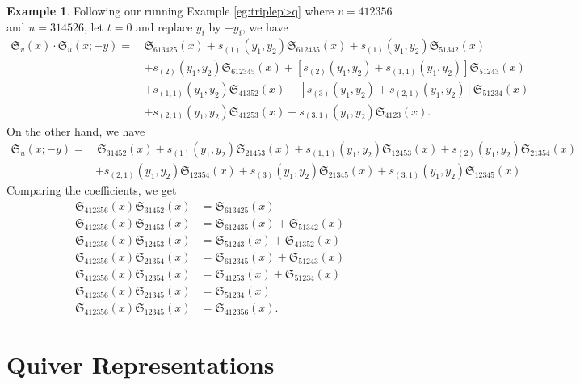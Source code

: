 \documentclass[12pt,reqno]{amsart}
\numberwithin{equation}{section}
\theoremstyle{definition}
\newtheorem{example}[theorem]{Example}
\begin{document}
\begin{example}
Following our running Example \ref{eg:triplep>q} where $v=412356$ and $u=314526$, let $t=0$ and replace $y_i$ by $-y_i$, we have
\begin{align*}
    \mathfrak{S}_{v}(x)\cdot
\mathfrak{S}_{u}(x;-y)
 =\, & \mathfrak{S}_{613425}(x)+ s_{(1)}(y_1,y_2)\mathfrak{S}_{612435}(x) +s_{(1)}(y_1,y_2)\mathfrak{S}_{51342}(x)\\ 
 & + s_{(2)}(y_1,y_2)\mathfrak{S}_{612345}(x)
 +[s_{(2)}(y_1,y_2)+s_{(1,1)}(y_1,y_2)]\mathfrak{S}_{51243}(x)\\
 & +s_{(1,1)}(y_1,y_2)\mathfrak{S}_{41352}(x) + [s_{(3)}(y_1,y_2)+s_{(2,1)}(y_1,y_2)]\mathfrak{S}_{51234}(x)\\
 & +s_{(2,1)}(y_1,y_2)\mathfrak{S}_{41253}(x)+s_{(3,1)}(y_1,y_2)\mathfrak{S}_{4123}(x).
\end{align*}
On the other hand, we have 
\begin{align*}
    \mathfrak{S}_{u}(x;-y)=&\,\mathfrak{S}_{31452}(x)+s_{(1)}(y_1,y_2)\mathfrak{S}_{21453}(x)+s_{(1,1)}(y_1,y_2)\mathfrak{S}_{12453}(x)
    +s_{(2)}(y_1,y_2)\mathfrak{S}_{21354}(x)\\
    &+s_{(2,1)}(y_1,y_2)\mathfrak{S}_{12354}(x)+s_{(3)}(y_1,y_2)\mathfrak{S}_{21345}(x)+s_{(3,1)}(y_1,y_2)\mathfrak{S}_{12345}(x).
\end{align*}
Comparing the coefficients, we get 
\begin{align*}
 \mathfrak{S}_{412356}(x)\mathfrak{S}_{31452}(x)&=\mathfrak{S}_{613425}(x)\\
 \mathfrak{S}_{412356}(x)\mathfrak{S}_{21453}(x)&=\mathfrak{S}_{612435}(x)+\mathfrak{S}_{51342}(x)\\
 \mathfrak{S}_{412356}(x)\mathfrak{S}_{12453}(x)&=\mathfrak{S}_{51243}(x)+\mathfrak{S}_{41352}(x)\\
\mathfrak{S}_{412356}(x)\mathfrak{S}_{21354}(x)&=\mathfrak{S}_{612345}(x)+\mathfrak{S}_{51243}(x)\\
    \mathfrak{S}_{412356}(x)\mathfrak{S}_{12354}(x)&=\mathfrak{S}_{41253}(x)+\mathfrak{S}_{51234}(x)\\
\mathfrak{S}_{412356}(x)\mathfrak{S}_{21345}(x)&=\mathfrak{S}_{51234}(x)\\
\mathfrak{S}_{412356}(x)\mathfrak{S}_{12345}(x)&=\mathfrak{S}_{412356}(x).
\end{align*} 
\end{example}


\appendix

\section{Quiver Representations}
\label{sec:Sorbit}
\end{document}
